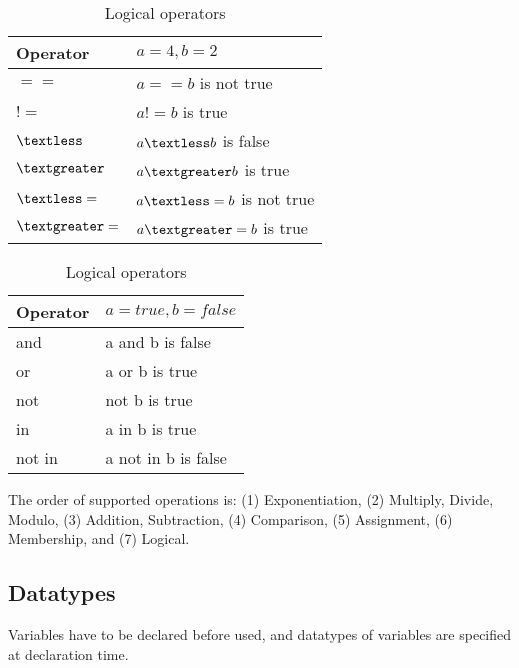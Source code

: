 \begin{table}[h]
\begin{center}
    \parbox{.4\linewidth}{
        \begin{tabular}{| l | l |}
        \hline
        Operator & $a=4, b=2$ \\ \hline
        $==$ & $a == b$ is not true \\ \hline
        $!=$ & $a != b$ is true \\ \hline
        $\textless$  & $a \textless b$ is false \\ \hline
        $\textgreater$  & $a \textgreater b$ is true \\ \hline
        $\textless=$ & $a \textless= b$ is not true \\ \hline
        $\textgreater=$ & $a \textgreater= b$ is true \\ \hline
        \end{tabular}
        \caption{Comparison operators.}
    }
    \parbox{.4\linewidth}{
        \begin{tabular}{| l | l |}
        \hline
        Operator & $a = true, b = false$ \\ \hline
        and & a and b is false \\ \hline
        or & a or b is true\\ \hline
        not & not b is true \\ \hline
        in & a in b is true \\ \hline
        not in & a not in b is false\\ \hline
        \end{tabular}
        \caption{Logical operators}
     }
\end{center}
\end{table}

The order of supported operations
is: (1) Exponentiation, (2) Multiply, Divide, Modulo, (3) Addition, Subtraction,
(4) Comparison, (5) Assignment, (6) Membership, and (7) Logical.

\subsection*{Datatypes}
Variables have to be declared before used, and datatypes of
variables are specified at declaration time.


